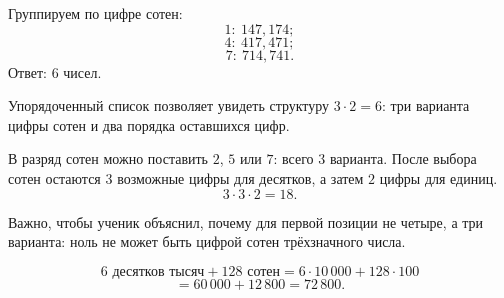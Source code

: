 \begin{teacheranswer}[Задание 6]
  Группируем по цифре сотен:
  \[
    1:\ 147,174;
  \]
  \[
    4:\ 417,471;
  \]
  \[
    7:\ 714,741.
  \]
  Ответ: \(6\) чисел.
\end{teacheranswer}

\begin{criterionbox}
  Упорядоченный список позволяет увидеть структуру \(3\cdot2=6\): три
  варианта цифры сотен и два порядка оставшихся цифр.
\end{criterionbox}

\begin{teacheranswer}[Задание 7*]
  В разряд сотен можно поставить \(2\), \(5\) или \(7\): всего \(3\)
  варианта. После выбора сотен остаются \(3\) возможные цифры для десятков,
  а затем \(2\) цифры для единиц.
  \[
    3\cdot3\cdot2=\boxed{18}.
  \]
\end{teacheranswer}

\begin{criterionbox}
  Важно, чтобы ученик объяснил, почему для первой позиции не четыре, а три
  варианта: ноль не может быть цифрой сотен трёхзначного числа.
\end{criterionbox}

\begin{teacheranswer}[Задание 8]
  \[
    6\text{ десятков тысяч}+128\text{ сотен}
    =6\cdot10\,000+128\cdot100
  \]
  \[
    =60\,000+12\,800=\boxed{72\,800}.
  \]
\end{teacheranswer}
